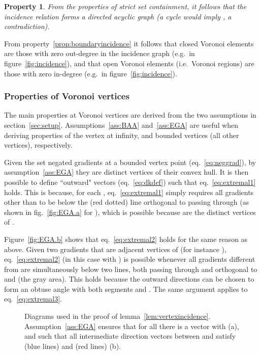 \documentclass[11pt]{article}
\newtheorem{property}{Property}
\begin{document}
\begin{property}
	From the properties of strict set containment, 
		it follows that the incidence relation  forms a directed acyclic graph  
	(a cycle  would imply , a contradiction). 
\end{property}



From property~\ref{prop:boundaryincidence} it follows that closed Voronoi elements 
	are those with zero out-degree in the incidence graph (e.g.\  in figure~\ref{fig:incidence}), 
and that open Voronoi elements (i.e.\ Voronoi regions) are those with zero in-degree 
	(e.g.\  in figure~\ref{fig:incidence}). 






\subsubsection{Properties of Voronoi vertices}


The main properties at Voronoi vertices are derived from the two assumptions in section~\ref{sec:setup}. 
Assumptions~\ref{ass:BAA} and~\ref{ass:EGA} are useful when deriving properties of the vertex at infinity, 
	and bounded vertices (all other vertices), respectively. 

Given the set negated gradients  at a bounded vertex point (eq.~\ref{eq:neggrad}), 
	by assumption~\ref{ass:EGA} they are distinct vertices of their convex hull. 
It is then possible to define ``outward" vectors  (eq.~\ref{eq:dkdef}) 
	such that eq.~\ref{eq:extremal1} holds. 
This is because, for each , 
	eq.~\ref{eq:extremal1} simply requires all gradients other than 
	to be below the (red dotted) line orthogonal to  passing through 
	(as shown in fig.~\ref{fig:EGA.a} for ), 
	which is possible because  are the distinct vertices of .
	
Figure~\ref{fig:EGA.b} shows that eq.~\ref{eq:extremal2} holds for the same reason as above. 
Given two gradients that are adjacent vertices of 
	(for instance ), 
	eq.~\ref{eq:extremal2} (in this case with )
	is possible whenever all gradients different from 
	are simultaneously below two lines, both passing through  and orthogonal to  and 
	(the gray area). 
This holds because the outward directions  can be chosen to form an obtuse angle with 
	both segments  and . 
The same argument applies to eq.~\ref{eq:extremal3}. 


\begin{figure}[htbp]
   \centering
	\quad\quad\quad
   \caption{Diagrams used in the proof of lemma~\ref{lem:vertexincidence}. 
   		Assumption~\ref{ass:EGA} ensures that for all  there is a vector  
				with  (a), 
			and such that all intermediate direction vectors  between  and  
				satisfy  (blue lines)
				and  (red lines) (b). }
   
\end{figure}
\end{document}

